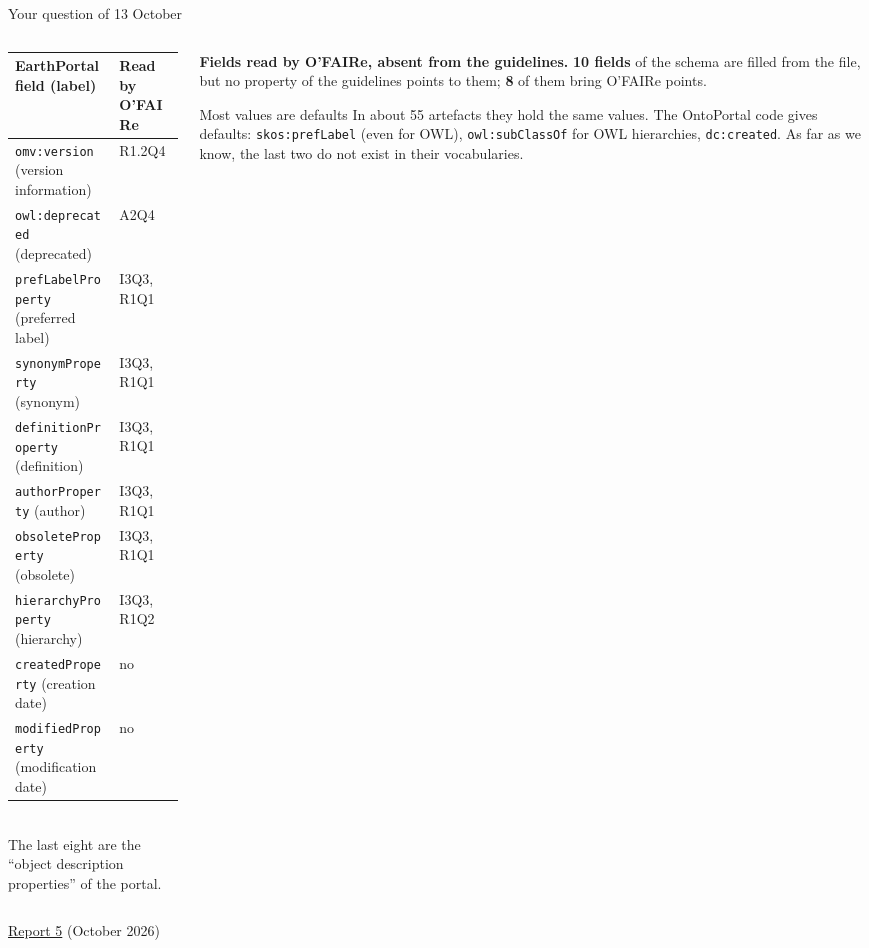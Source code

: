 \documentclass[aspectratio=169,10pt]{beamer}
\newcommand{\evidence}[1]{{\scriptsize\color{epgrey}#1}}
\begin{document}
\begin{frame}{Your question of 13 October}
  \begin{columns}[T]
    \begin{column}{0.53\textwidth}
      \scriptsize
      \begin{tabular}{@{}l l@{}}
        \toprule
        EarthPortal field (label) & Read by O'FAIRe\\
        \midrule
        \texttt{omv:version} (version information) & R1.2Q4\\
        \texttt{owl:deprecated} (deprecated) & A2Q4\\
        \texttt{prefLabelProperty} (preferred label) & I3Q3, R1Q1\\
        \texttt{synonymProperty} (synonym) & I3Q3, R1Q1\\
        \texttt{definitionProperty} (definition) & I3Q3, R1Q1\\
        \texttt{authorProperty} (author) & I3Q3, R1Q1\\
        \texttt{obsoleteProperty} (obsolete) & I3Q3, R1Q1\\
        \texttt{hierarchyProperty} (hierarchy) & I3Q3, R1Q2\\
        \texttt{createdProperty} (creation date) & no\\
        \texttt{modifiedProperty} (modification date) & no\\
        \bottomrule
      \end{tabular}\\[4pt]
      {\tiny The last eight are the ``object description properties'' of the portal.}
    \end{column}
    \begin{column}{0.44\textwidth}
      \small
      \textbf{Fields read by O'FAIRe, absent from the guidelines.} \textbf{10 fields} of the schema
      are filled from the file, but no property of the guidelines points to them; \textbf{8} of them
      bring O'FAIRe points.\\[6pt]
      \begin{alertblock}{Most values are defaults}
        \scriptsize In about 55 artefacts they hold the same values. The OntoPortal code gives
        defaults: \texttt{skos:prefLabel} (even for OWL), \texttt{owl:subClassOf} for OWL hierarchies,
        \texttt{dc:created}. As far as we know, the last two do not exist in their vocabularies.
      \end{alertblock}
    \end{column}
  \end{columns}
  \vfill
  \evidence{\href{https://github.com/EarthPortal/SA_Management/blob/main/docs/build/emmanuel_dataTerra_Report5-Cheatsheet-vs-EarthPortal.pdf}{Report 5} (October 2026)}
\end{frame}
\end{document}
